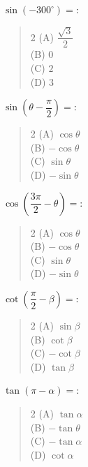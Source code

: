 \documentclass[11pt,a4paper]{article}
\begin{document}
\begin{mcqlist}
\item $\sin(-300^{\circ}) = $:
\begin{quote}\begin{multicols}{2}
\noindent (A) $\dfrac{\sqrt{3}}{2}$ \\
(B) $0$ \\
(C) $2$ \\
(D) $3$
\end{multicols}\end{quote}

\item $\sin\left(\theta-\dfrac{\pi}{2}\right) = $:
\begin{quote}\begin{multicols}{2}
\noindent (A) $\cos\theta$ \\
(B) $-\cos\theta$ \\
(C) $\sin\theta$ \\
(D) $-\sin\theta$
\end{multicols}\end{quote}

\item $\cos\left(\dfrac{3\pi}{2}-\theta\right) = $:
\begin{quote}\begin{multicols}{2}
\noindent (A) $\cos\theta$ \\
(B) $-\cos\theta$ \\
(C) $\sin\theta$ \\
(D) $-\sin\theta$
\end{multicols}\end{quote}

\item $\cot\left(\dfrac{\pi}{2}-\beta\right) = $:
\begin{quote}\begin{multicols}{2}
\noindent (A) $\sin\beta$ \\
(B) $\cot\beta$ \\
(C) $-\cot\beta$ \\
(D) $\tan\beta$
\end{multicols}\end{quote}

\item $\tan(\pi-\alpha) = $:
\begin{quote}\begin{multicols}{2}
\noindent (A) $\tan\alpha$ \\
(B) $-\tan\theta$ \\
(C) $-\tan\alpha$ \\
(D) $\cot\alpha$
\end{multicols}\end{quote}


\end{mcqlist}
\end{document}
